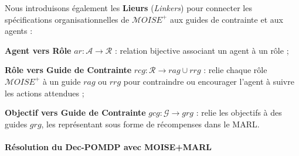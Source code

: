 \documentclass[pdflatex,sn-mathphys-num]{sn-jnl}%
\theoremstyle{thmstyleone}%
\theoremstyle{thmstyletwo}%
\theoremstyle{thmstylethree}%
\begin{document}
\vspace{0.8em}

\noindent Nous introduisons également les \textbf{Lieurs} (\textit{Linkers}) pour connecter les spécifications organisationnelles de $\mathcal{M}OISE^+$ aux guides de contrainte et aux agents :

\begin{enumerate*}[label={\roman*) },itemjoin={; \quad}]
    \item \textbf{Agent vers Rôle} \quad $ar: \mathcal{A} \to \mathcal{R}$ : relation bijective associant un agent à un rôle ;
    
    \item \textbf{Rôle vers Guide de Contrainte} \quad $rcg: \mathcal{R} \rightarrow rag \cup rrg$ : relie chaque rôle $\mathcal{M}OISE^+$ à un guide $rag$ ou $rrg$ pour contraindre ou encourager l’agent à suivre les actions attendues ;
    
    \item \textbf{Objectif vers Guide de Contrainte} \quad $gcg: \mathcal{G} \rightarrow grg$ : relie les objectifs à des guides $grg$, les représentant sous forme de récompenses dans le MARL.
\end{enumerate*}

\paragraph{\textbf{Résolution du Dec-POMDP avec MOISE+MARL}}
\end{document}
